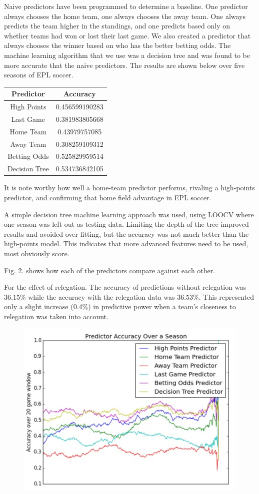 \documentclass[conference]{IEEEtran}
\begin{document}
 Naive predictors have been programmed to determine a baseline. One predictor always chooses the home team, one always chooses the away team. One always predicts the team higher in the standings, and one predicts based only on whether teams had won or lost their last game. We also created a predictor that always chooses the winner based on who has the better betting odds. The machine learning algorithm that we use was a decision tree and was found to be more accurate that the naive predictors. The results are shown below over five seasons of EPL soccer.

\begin{center}
  \begin{tabular}{@{} cc @{}}
    \hline
    Predictor & Accuracy \\ 
    \hline
High Points & 0.456599190283 \\ 
    Last Game & 0.381983805668\\ 
    Home Team & 0.43979757085 \\ 
    Away Team & 0.308259109312\\ 
    Betting Odds & 0.525829959514\\
    Decision Tree & 0.534736842105\\
    \hline
  \end{tabular}
\end{center}

It is note worthy how well a home-team predictor performs, rivaling a high-points predictor, and confirming that home field advantage in EPL soccer.

A simple decision tree machine learning approach was used, using LOOCV where one season was left out as testing data. Limiting the depth of the tree improved results and avoided over fitting, but the accuracy was not much better than the high-points model. This indicates that more advanced features need to be used, most obviously score.

Fig. 2. shows how each of the predictors compare against each other. 

For the effect of relegation. The accuracy of predictions without relegation was 36.15\% while the accuracy with the relegation data was 36.53\%. This represented only a slight increase (0.4\%) in predictive power when a team's closeness to relegation was taken into account.

\begin{figure}[t]
\centering
\includegraphics[width=0.7\linewidth]{graph}
\caption{}
\label{fig:graph}
\end{figure}
\end{document}
